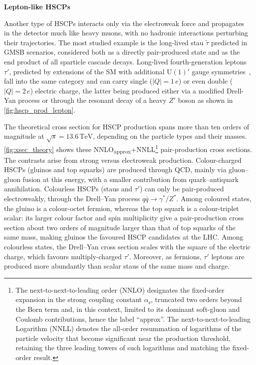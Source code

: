 

\newpage

\vspace{0.5 cm}
\noindent \textbf{Lepton-like HSCPs}
\vspace{0.5 cm}

Another type of HSCPs interacts only via the electroweak force and propagates in the detector much like heavy muons, with no hadronic interactions perturbing their trajectories. The most studied example is the long-lived stau $\tilde{\tau}$ predicted in GMSB scenarios, considered both as a directly pair-produced state and as the end product of all sparticle cascade decays. Long-lived fourth-generation leptons $\tau'$, predicted by extensions of the SM with additional $\mathrm{U}(1)'$ gauge symmetries~\cite{Hewett:2009bw}, fall into the same category and can carry single ($|Q|=1\,e$) or even double ($|Q|=2\,e$) electric charge, the latter being produced either via a modified Drell-Yan process or through the resonant decay of a heavy $Z'$ boson as shown in \cref{fig:hscp_prod_lepton}.



\vspace{0.5 cm}

The theoretical cross section for HSCP production spans more than ten orders of magnitude at $\sqrt{s} = 13.6\,\mathrm{TeV}$, depending on the particle types and their masses. \cref{fig:xsec_theory} shows these NNLO\textsubscript{approx}+NNLL\footnote{The next-to-next-to-leading order (NNLO) designates the fixed-order expansion in the strong coupling constant $\alpha_\mathrm{s}$, truncated two orders beyond the Born term and, in this context, limited to its dominant soft-gluon and Coulomb contributions, hence the label ``approx''. The next-to-next-to-leading Logarithm (NNLL) denotes the all-order resummation of logarithms of the particle velocity that become significant near the production threshold, retaining the three leading towers of such logarithms and matching the fixed-order result.} pair-production cross sections. The contrasts arise from strong versus electroweak production. Colour-charged HSCPs (gluinos and top squarks) are produced through QCD, mainly via gluon--gluon fusion at this energy, with a smaller contribution from quark--antiquark annihilation. Colourless HSCPs (staus and $\tau'$) can only be pair-produced electroweakly, through the Drell--Yan process $q\overline{q}\to\gamma^*/Z^*$. Among coloured states, the gluino is a colour-octet fermion, whereas the top squark is a colour-triplet scalar: its larger colour factor and spin multiplicity give a pair-production cross section about two orders of magnitude larger than that of top squarks of the same mass, making gluinos the favoured HSCP candidates at the LHC. Among colourless states, the Drell--Yan cross section scales with the square of the electric charge, which favours multiply-charged $\tau'$. Moreover, as fermions, $\tau'$ leptons are produced more abundantly than scalar staus of the same mass and charge.

